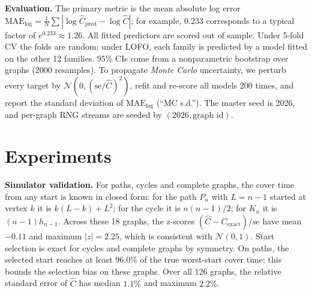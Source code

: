 \documentclass{article} %
\begin{document}
\textbf{Evaluation.} The primary metric is the mean absolute log error $\mathrm{MAE}_{\log}=\frac1N\sum|\log\hat C_{\text{pred}}-\log\hat C|$; for example, $0.233$ corresponds to a typical factor of $e^{0.233}\approx1.26$. All fitted predictors are scored out of sample. Under 5-fold CV the folds are random; under LOFO, each family is predicted by a model fitted on the other 12 families. 95\% CIs come from a nonparametric bootstrap over graphs (2000 resamples). To propagate \emph{Monte Carlo} uncertainty, we perturb every target by $\mathcal N(0,(\mathrm{se}/\hat C)^2)$, refit and re-score all models 200 times, and report the standard deviation of $\mathrm{MAE}_{\log}$ (``MC s.d.''). The master seed is 2026, and per-graph RNG streams are seeded by $(2026,\text{graph id})$.

\section{Experiments}
\textbf{Simulator validation.} For paths, cycles and complete graphs, the cover time from any start is known in closed form: for the path $P_n$ with $L=n-1$ started at vertex $k$ it is $k(L-k)+L^2$; for the cycle it is $n(n-1)/2$; for $K_n$ it is $(n-1)h_{n-1}$. Across these 18 graphs, the z-scores $(\hat C-C_{\text{exact}})/\mathrm{se}$ have mean $-0.11$ and maximum $|z|=2.25$, which is consistent with $\mathcal N(0,1)$. Start selection is exact for cycles and complete graphs by symmetry. On paths, the selected start reaches at least $96.0\%$ of the true worst-start cover time; this bounds the selection bias on these graphs. Over all 126 graphs, the relative standard error of $\hat C$ has median $1.1\%$ and maximum $2.2\%$.

\begin{table}[t]
\caption{Out-of-sample accuracy over 126 graphs. MAE$_{\log}$ with bootstrap 95\% CI; ``MC s.d.'' is the standard deviation of MAE$_{\log}$ caused by Monte Carlo noise in the targets; ``median ratio'' is the median of predicted/true; the last column is the fraction of graphs predicted within $\pm25\%$.}
\label{tab:main}
\centering\small
\resizebox{\linewidth}{!}{}
\end{table}
\end{document}

